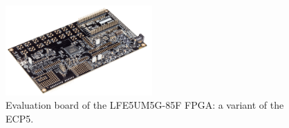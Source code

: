 \begin{figure}
\centering
\includegraphics[width=0.5\textwidth]{images/ECP5.png}
\caption[Evaluation board of the LFE5UM5G-85F FPGA: a variant of the ECP5.]{Evaluation board of the LFE5UM5G-85F FPGA: a variant of the ECP5.\footnotemark}
\label{fig:evaluationboard}
\end{figure}





